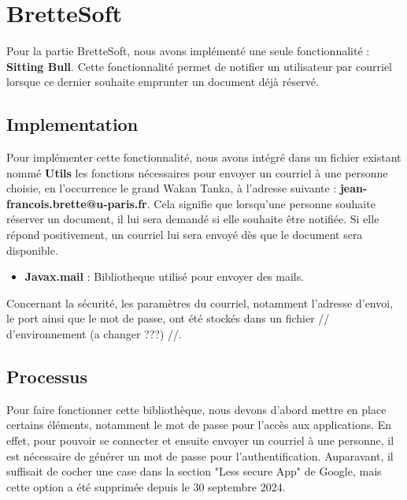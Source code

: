\chapter*{BretteSoft}

Pour la partie BretteSoft, nous avons implémenté une seule fonctionnalité : \textbf{Sitting Bull}.
Cette fonctionnalité permet de notifier un utilisateur par courriel lorsque ce dernier souhaite emprunter
un document déjà réservé.

\section{Implementation}

\bigskip

Pour implémenter cette fonctionnalité, nous avons intégré dans un fichier existant nommé \textbf{Utils} les
fonctions nécessaires pour envoyer un courriel à une personne choisie, en l'occurrence le grand Wakan Tanka,
à l'adresse suivante : \textbf{jean-francois.brette@u-paris.fr}. Cela signifie que lorsqu'une personne souhaite réserver un document,
il lui sera demandé si elle souhaite être notifiée. Si elle répond positivement, un courriel lui sera envoyé dès que
le document sera disponible.

\begin{itemize}
    \item \textbf{Javax.mail} : Bibliotheque utilisé pour envoyer des mails.
\end{itemize}

Concernant la sécurité, les paramètres du courriel, notamment l'adresse d'envoi, le port ainsi que le mot de passe,
ont été stockés dans un fichier // d'environnement (a changer ???) //.

\section{Processus}

\bigskip

Pour faire fonctionner cette bibliothèque, nous devons d'abord mettre en place certains éléments, notamment le mot
de passe pour l'accès aux applications. En effet, pour pouvoir se connecter et ensuite envoyer un courriel à une personne,
il est nécessaire de générer un mot de passe pour l'authentification. Auparavant, il suffisait de cocher une case dans la
section "Less secure App" de Google, mais cette option a été supprimée depuis le 30 septembre 2024.


